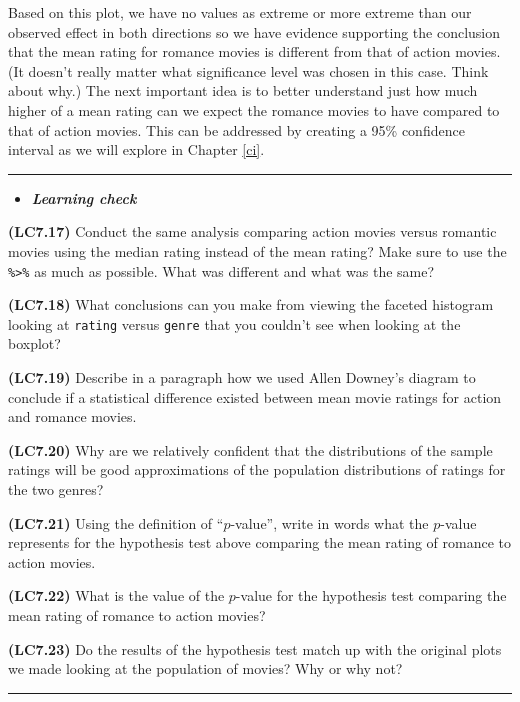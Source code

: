 \documentclass[]{tufte-book}
\let\oldrule=\rule
\renewcommand{\rule}[1]{\oldrule{\linewidth}}
\newenvironment{rmdblock}[1]
  {\begin{shaded*}
  \begin{itemize}
  \renewcommand{\labelitemi}{
    \raisebox{-.7\height}[0pt][0pt]{
    }
  }
  \item
  }
  {
  \end{itemize}
  \end{shaded*}
  }
\newenvironment{learncheck}
  {\begin{rmdblock}{warning}}
  {\end{rmdblock}}
\begin{document}
Based on this plot, we have no values as extreme or more extreme than
our observed effect in both directions so we have evidence supporting
the conclusion that the mean rating for romance movies is different from
that of action movies. (It doesn't really matter what significance level
was chosen in this case. Think about why.) The next important idea is to
better understand just how much higher of a mean rating can we expect
the romance movies to have compared to that of action movies. This can
be addressed by creating a 95\% confidence interval as we will explore
in Chapter \ref{ci}.

\begin{center}\rule{0.5\linewidth}{\linethickness}\end{center}

\begin{learncheck}
\textbf{\emph{Learning check}}
\end{learncheck}

\textbf{(LC7.17)} Conduct the same analysis comparing action movies
versus romantic movies using the median rating instead of the mean
rating? Make sure to use the \texttt{\%\textgreater{}\%} as much as
possible. What was different and what was the same?

\textbf{(LC7.18)} What conclusions can you make from viewing the faceted
histogram looking at \texttt{rating} versus \texttt{genre} that you
couldn't see when looking at the boxplot?

\textbf{(LC7.19)} Describe in a paragraph how we used Allen Downey's
diagram to conclude if a statistical difference existed between mean
movie ratings for action and romance movies.

\textbf{(LC7.20)} Why are we relatively confident that the distributions
of the sample ratings will be good approximations of the population
distributions of ratings for the two genres?

\textbf{(LC7.21)} Using the definition of ``\(p\)-value'', write in
words what the \(p\)-value represents for the hypothesis test above
comparing the mean rating of romance to action movies.

\textbf{(LC7.22)} What is the value of the \(p\)-value for the
hypothesis test comparing the mean rating of romance to action movies?

\textbf{(LC7.23)} Do the results of the hypothesis test match up with
the original plots we made looking at the population of movies? Why or
why not?

\begin{center}\rule{0.5\linewidth}{\linethickness}\end{center}
\end{document}

